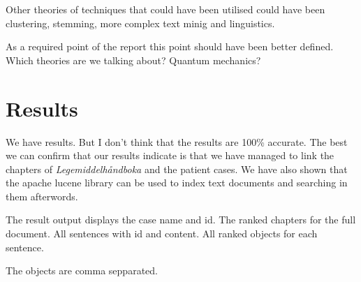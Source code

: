 \documentclass[12pt, a4paper]{article}
\begin{document}
Other theories of techniques that could have been utilised could have been
clustering, stemming, more complex text minig and linguistics. 

As a required point of the report this point should have been better defined.
Which theories are we talking about? Quantum mechanics?

\section{Results}
We have results. But I don't think that the results are 100\% accurate. 
The best we can confirm that our results indicate is that we have managed to
link the chapters of \textit{Legemiddelhåndboka} and the patient cases. We have
also shown that the apache lucene library can be used to index text documents
and searching in them afterwords. 

The result output displays the case name and id. The ranked chapters for the
full document. All sentences with id and content. All ranked objects for each sentence. 

The objects are comma sepparated. 
\end{document}
